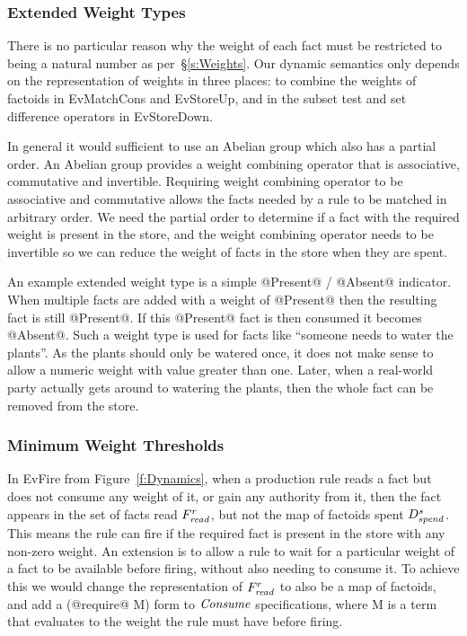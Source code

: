 \subsubsection{Extended Weight Types}
There is no particular reason why the weight of each fact must be restricted to being a natural number as per~\S\ref{s:Weights}. Our dynamic semantics only depends on the representation of weights in three places: to combine the weights of factoids in EvMatchCons and EvStoreUp, and in the subset test and set difference operators in EvStoreDown.

In general it would sufficient to use an Abelian group which also has a partial order. An Abelian group provides a weight combining operator that is associative, commutative and invertible. Requiring weight combining operator to be associative and commutative allows the facts needed by a rule to be matched in arbitrary order. We need the partial order to determine if a fact with the required weight is present in the store, and the weight combining operator needs to be invertible so we can reduce the weight of facts in the store when they are spent.

An example extended weight type is a simple @Present@ / @Absent@ indicator. When multiple facts are added with a weight of @Present@ then the resulting fact is still @Present@. If this @Present@ fact is then consumed it becomes @Absent@. Such a weight type is used for facts like ``someone needs to water the plants''. As the plants should only be watered once, it does not make sense to allow a numeric weight with value greater than one. Later, when a real-world party actually gets around to watering the plants, then the whole fact can be removed from the store.


\subsubsection{Minimum Weight Thresholds}
In EvFire from Figure~\ref{f:Dynamics}, when a production rule reads a fact but does not consume any weight of it, or gain any authority from it, then the fact appears in the set of facts read $F^r_{\mathit{read}}$, but not the map of factoids spent $D^s_{\mathit{spend}}$. This means the rule can fire if the required fact is present in the store with any non-zero weight. An extension is to allow a rule to wait for a particular weight of a fact to be available before firing, without also needing to consume it. To achieve this we would change the representation of $F^r_{\mathit{read}}$ to also be a map of factoids, and add a (@require@ M) form to $\mathit{Consume}$ specifications, where M is a term that evaluates to the weight the rule must have before firing.

